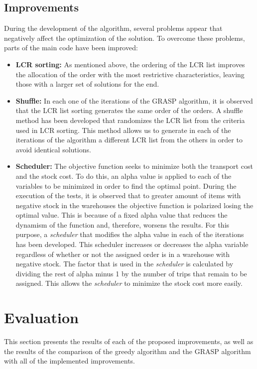 \documentclass[letterpaper]{article} %
\begin{document}
\subsection*{Improvements}
During the development of the algorithm, several problems appear that negatively affect the optimization of the solution. To overcome these problems, parts of the main code have been improved:
\begin{itemize}
    \item \textbf{LCR sorting:} As mentioned above, the ordering of the LCR list improves the allocation of the order with the most restrictive characteristics, leaving those with a larger set of solutions for the end.
    \item \textbf{Shuffle:} In each one of the iterations of the GRASP algorithm, it is observed that the LCR list sorting generates the same order of the orders. A shuffle method has been developed that randomizes the LCR list from the criteria used in LCR sorting. This method allows us to generate in each of the iterations of the algorithm a different LCR list from the others in order to avoid identical solutions.
    \item \textbf{Scheduler:} The objective function seeks to minimize both the transport cost and the stock cost. To do this, an alpha value is applied to each of the variables to be minimized in order to find the optimal point. During the execution of the tests, it is observed that to greater amount of items with negative stock in the warehouses the objective function is polarized losing the optimal value. This is because of a fixed alpha value that reduces the dynamism of the function and, therefore, worsens the results. For this purpose, a \textit{scheduler} that modifies the alpha value in each of the iterations has been developed. This scheduler increases or decreases the alpha variable regardless of whether or not the assigned order is in a warehouse with negative stock. The factor that is used in the \textit{scheduler} is calculated by dividing the rest of alpha minus 1 by the number of trips that remain to be assigned. This allows the \textit{scheduler} to minimize the stock cost more easily.
\end{itemize}

\section*{Evaluation}


This section presents the results of each of the proposed improvements, as well as the results of the comparison of the greedy algorithm and the GRASP  algorithm with all of the implemented improvements.
\end{document}
